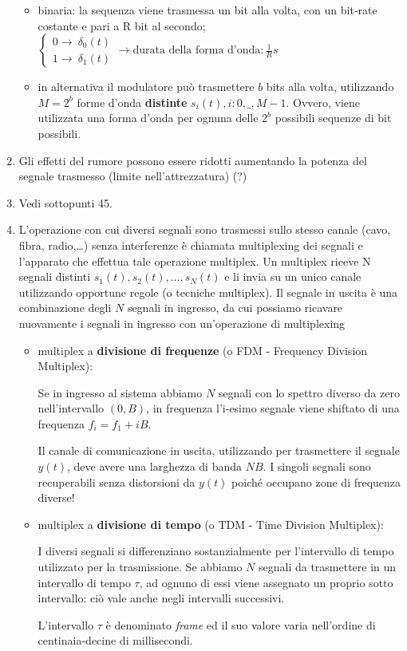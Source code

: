 \documentclass[
]{article}
\begin{document}
\begin{enumerate}
  \begin{itemize}
  \item
    binaria: la sequenza viene trasmessa un bit alla volta, con un
    bit-rate costante e pari a R bit al secondo;
    \(\left\{ \begin{array}{cl}0 \to \ \delta_0(t)\\1 \to \ \delta_1(t)\end{array} \right.\to \text{durata della forma d'onda}: \frac{1}{R}s\)\\
  \item
    in alternativa il modulatore può trasmettere \(b\) bits alla volta,
    utilizzando \(M=2^b\) forme d'onda \textbf{distinte}
    \(s_i(t), i:0, \_, M-1\). Ovvero, viene utilizzata una forma d'onda
    per ognuna delle \(2^b\) possibili sequenze di bit possibili.
  \end{itemize}
\item
  Gli effetti del rumore possono essere ridotti aumentando la potenza
  del segnale trasmesso (limite nell'attrezzatura) (?)
\item
  Vedi sottopunti 45.
\item
  L'operazione con cui diversi segnali sono trasmessi sullo stesso
  canale (cavo, fibra, radio,\ldots) senza interferenze è chiamata
  multiplexing dei segnali e l'apparato che effettua tale operazione
  multiplex. Un multiplex riceve N segnali distinti
  \(s_1 (t), s_2 (t), …, s_ N(t)\) e li invia su un unico canale
  utilizzando opportune regole (o tecniche multiplex). Il segnale in
  uscita è una combinazione degli \(N\) segnali in ingresso, da cui
  possiamo ricavare nuovamente i segnali in ingresso con un'operazione
  di multiplexing

  \begin{itemize}
  \item
    multiplex a \textbf{divisione di frequenze} (o FDM - Frequency
    Division Multiplex):

    Se in ingresso al sistema abbiamo \(N\) segnali con lo spettro
    diverso da zero nell'intervallo \((0, B)\), in frequenza l'i-esimo
    segnale viene shiftato di una frequenza \(f_i = f_1 + iB\).

    Il canale di comunicazione in uscita, utilizzando per trasmettere il
    segnale \(y(t)\), deve avere una larghezza di banda \(NB\). I
    singoli segnali sono recuperabili senza distorsioni da \(y(t)\)
    poiché occupano zone di frequenza diverse!
  \item
    multiplex a \textbf{divisione di tempo} (o TDM - Time Division
    Multiplex):

    I diversi segnali si differenziano sostanzialmente per l'intervallo
    di tempo utilizzato per la trasmissione. Se abbiamo \(N\) segnali da
    trasmettere in un intervallo di tempo \(\tau\), ad ognuno di essi
    viene assegnato un proprio sotto intervallo: ciò vale anche negli
    intervalli successivi.

    L'intervallo \(\tau\) è denominato \emph{frame} ed il suo valore
    varia nell'ordine di centinaia-decine di millisecondi.
  \end{itemize}
\end{enumerate}
\end{document}
